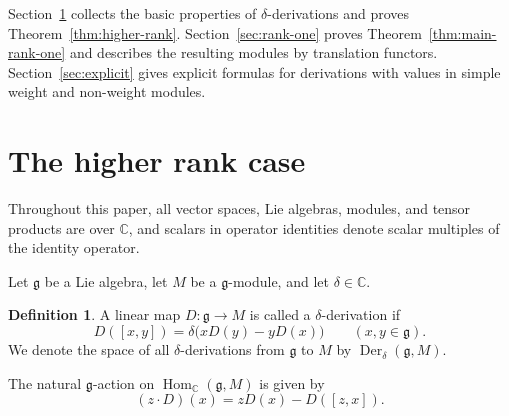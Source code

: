 \documentclass[11pt,reqno]{amsart}
\numberwithin{equation}{section}
\newcommand{\C}{\mathbb C}
\newcommand{\g}{\mathfrak g}
\DeclareMathOperator{\Der}{Der}
\DeclareMathOperator{\Hom}{Hom}
\theoremstyle{definition}
\newtheorem{definition}[theorem]{Definition}
\theoremstyle{remark}
\begin{document}
Section~\ref{sec:rigidity} collects the basic properties of
\(\delta\)-derivations and proves Theorem~\ref{thm:higher-rank}.
Section~\ref{sec:rank-one} proves
Theorem~\ref{thm:main-rank-one} and describes the resulting modules
by translation functors. Section~\ref{sec:explicit} gives explicit formulas for derivations
with values in simple weight and non-weight modules.

\section{The higher rank case}\label{sec:rigidity}

Throughout this paper, all vector spaces, Lie algebras, modules, and
tensor products are over \(\C\), and scalars in operator identities
denote scalar multiples of the identity operator.

Let \(\g\) be a Lie algebra, let \(M\) be a \(\g\)-module,
and let \(\delta\in\C\).

\begin{definition}\label{def:delta-derivation}
A linear map \(D:\g\to M\) is called a \(\delta\)-derivation if
\begin{equation}\label{eq:definition}
D([x,y])=\delta\bigl(xD(y)-yD(x)\bigr)
\qquad(x,y\in\g).
\end{equation}
We denote the space of all \(\delta\)-derivations from \(\g\) to \(M\)
by \(\Der_\delta(\g,M)\).
\end{definition}

The natural \(\g\)-action on \(\Hom_\C(\g,M)\) is given by
\begin{equation}\label{eq:action}
(z\cdot D)(x)=zD(x)-D([z,x]).
\end{equation}
\end{document}
